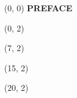 \documentclass[10pt]{article}
\begin{document}
\begin{textblock}{31}(0, 0)
    \center\huge\textbf{PREFACE}
\end{textblock}

\begin{textblock}{6}(0, 2)
    {}
\end{textblock}

\begin{textblock}{7}(7, 2)
    {}
\end{textblock}

\begin{textblock}{4}(15, 2)
    {}
\end{textblock}

\begin{textblock}{11}(20, 2)
    {}
\end{textblock}
\end{document}
